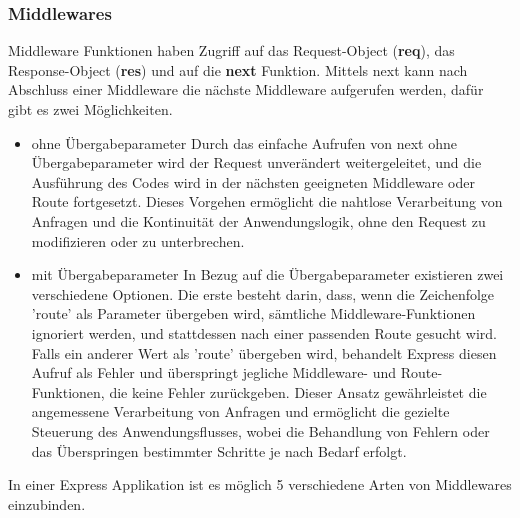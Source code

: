 \subsubsection{Middlewares}
Middleware Funktionen haben Zugriff auf das Request-Object (\textbf{req}), das Response-Object (\textbf{res}) und auf die \textbf{next} Funktion. Mittels next kann nach Abschluss einer Middleware die nächste Middleware aufgerufen werden, dafür gibt es zwei Möglichkeiten.
\begin{itemize}
    \item ohne Übergabeparameter
        \newline
        Durch das einfache Aufrufen von next ohne Übergabeparameter wird der Request unverändert weitergeleitet, und die Ausführung des Codes wird in der nächsten geeigneten Middleware oder Route fortgesetzt. Dieses Vorgehen ermöglicht die nahtlose Verarbeitung von Anfragen und die Kontinuität der Anwendungslogik, ohne den Request zu modifizieren oder zu unterbrechen.
    \item mit Übergabeparameter
        \newline
        In Bezug auf die Übergabeparameter existieren zwei verschiedene Optionen. Die erste besteht darin, dass, wenn die Zeichenfolge 'route' als Parameter übergeben wird, sämtliche Middleware-Funktionen ignoriert werden, und stattdessen nach einer passenden Route gesucht wird. Falls ein anderer Wert als 'route' übergeben wird, behandelt Express diesen Aufruf als Fehler und überspringt jegliche Middleware- und Route-Funktionen, die keine Fehler zurückgeben. Dieser Ansatz gewährleistet die angemessene Verarbeitung von Anfragen und ermöglicht die gezielte Steuerung des Anwendungsflusses, wobei die Behandlung von Fehlern oder das Überspringen bestimmter Schritte je nach Bedarf erfolgt.
\end{itemize}
In einer Express Applikation ist es möglich 5 verschiedene Arten von Middlewares einzubinden.

